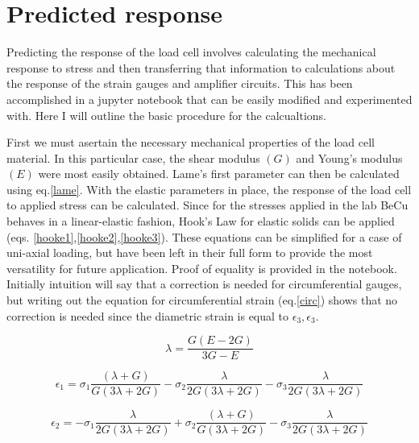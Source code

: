 \section{Predicted response}

Predicting the response of the load cell involves calculating the mechanical response to stress and then transferring that information to calculations about the response of the strain gauges and amplifier circuits. This has been accomplished in a jupyter notebook that can be easily modified and experimented with. Here I will outline the basic procedure for the calcualtions.

First we must asertain the necessary mechanical properties of the load cell material. In this particular case, the shear modulus $(G)$ and Young's modulus $(E)$ were most easily obtained. Lame's first parameter can then be calculated using eq.\ref{lame}. With the elastic parameters in place, the response of the load cell to applied stress can be calculated. Since for the stresses applied in the lab BeCu behaves in a linear-elastic fashion, Hook's Law for elastic solids can be applied (eqs. \ref{hooke1},\ref{hooke2},\ref{hooke3}). These equations can be simplified for a case of uni-axial loading, but have been left in their full form to provide the most versatility for future application. Proof of equality is provided in the notebook. Initially intuition will say that a correction is needed for circumferential gauges, but writing out the equation for circumferential strain (eq.\ref{circ}) shows that no correction is needed since the diametric strain is equal to $\epsilon_3, \epsilon_3$.

\begin{equation}
	\lambda = \frac{G(E-2G)}{3G-E}
	\label{lame}
\end{equation}

\begin{equation}
	\epsilon_1 = \sigma_1\frac{(\lambda+G)}{G(3 \lambda+2G)} - \sigma_2\frac{\lambda}{2G(3\lambda+2G)} -
\sigma_3\frac{\lambda}{2G(3\lambda+2G)}
	\label{hooke1}
\end{equation}

\begin{equation}
	\epsilon_2 = -\sigma_1\frac{\lambda}{2G(3\lambda+2G)} + \sigma_2\frac{(\lambda+G)}{G(3 \lambda+2G)} - \sigma_3\frac{\lambda}{2G(3\lambda+2G)}
	\label{hooke2}
\end{equation}

